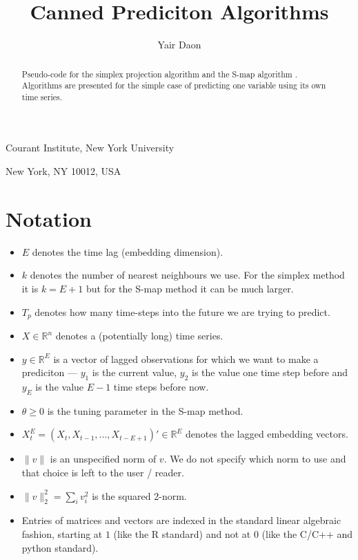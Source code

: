 \documentclass{article}
\theoremstyle{definition}
\newcommand{\R}{\mathbb{R}}
\begin{document}
\title{Canned Prediciton Algorithms}

\author{Yair Daon}

\maketitle

{\footnotesize 
 \centerline{Courant Institute, New York University}
   \centerline{New York, NY 10012, USA}
}

\bigskip
 
\begin{abstract}
  Pseudo-code for the simplex projection algorithm
  \cite{SugiharaMay90} and the S-map algorithm \cite{Sugihara94}.
  Algorithms are presented for the simple case of predicting one
  variable using its own time series.
\end{abstract}

\section{Notation}\label{section:notation}
\begin{itemize}
\item $E$ denotes the time lag (embedding dimension).
\item $k$ denotes the number of nearest neighbours we use. For
  the simplex method it is $k=E+1$ but for the S-map method it
  can be much larger.
\item $T_p$ denotes how many time-steps into the future we are trying
  to predict.
\item $X\in \R^n$ denotes a (potentially long) time series.
\item $y\in \R^{E}$ is a vector of lagged observations for which we
  want to make a prediciton --- $y_1$ is the current value, $y_2$ is
  the value one time step before and $y_{E}$ is the value $E-1$ time
  steps before now.
\item $\theta \geq 0$ is the tuning parameter in the S-map method.
\item $X_t^E = (X_t, X_{t-1},..., X_{t-E+1} )' \in \R^E$ denotes the
  lagged embedding vectors.
\item $\| v \|$ is an unspecified norm of $v$. We do not specify
  which norm to use and that choice is left to the user / reader.
\item $\| v \|_2^2 = \sum_i v_i^2$ is the squared 2-norm. 
\item Entries of matrices and vectors are indexed in the standard
  linear algebraic fashion, starting at $1$ (like the R standard) and
  not at $0$ (like the C/C++ and python standard).
\end{itemize}
\end{document}
